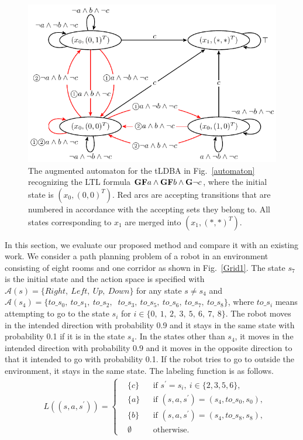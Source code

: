 \documentclass[letterpaper, 10 pt, conference]{ieeeconf}  %
\begin{document}
\begin{figure}[htbp]
   \centering
   \includegraphics[bb=0 0 374 207,scale=0.75]{ldgba.pdf}
   \caption{The augmented automaton for the tLDBA in Fig.~\ref{automaton} recognizing the LTL formula $\text{{\bf GF}}a \wedge \text{{\bf GF}}b \wedge \text{{\bf G}}\neg c$, where the initial state is $(x_0, (0,0)^T )$. Red arcs are accepting transitions that are numbered in accordance with the accepting sets they belong to. All states corresponding to $x_1$ are merged into $(x_1, (*,*)^T )$.}
   \label{automaton_aug}
\end{figure}

In this section, we evaluate our proposed method and compare it with an existing work.
We consider a path planning problem of a robot in an environment consisting of eight rooms and one corridor as shown in Fig.\ \ref{Grid1}. The state $s_7$ is the initial state and the action space is specified with $\mathcal{A}(s) = \{ Right,\ Left,\ Up,\ Down \}$ for any state $s \neq s_4$ and $\mathcal{A}(s_4) = \{ to\_s_0,\ to\_s_1,\ to\_s_2,$ $\ to\_s_3,\ to\_s_5,\ to\_s_6,\ to\_s_7,\ to\_s_8 \}$, where $to\_s_i$ means attempting to go to the state $s_i$ for $i \in \{0,\ 1,\ 2,\ 3,\ 5,\ 6,\ 7,\ 8 \}$. The robot moves in the intended direction with probability 0.9 and it stays in the same state with probability 0.1 if it is in the state $s_4$. In the states other than $s_4$, it moves in the intended direction with probability 0.9 and it moves in the opposite direction to that it intended to go with probability 0.1. If the robot tries to go to outside the environment, it stays in the same state. The labeling function is as follows.
\begin{align*}
      & L((s, a, s^{\prime})) =
      \left\{
      \begin{aligned}
        & \{ c \} &  & \text{if }s^{\prime} = s_i,\ i \in \{ 2,3,5,6 \}, \nonumber \\
        & \{ a \} &  & \text{if }(s,a,s^{\prime})=(s_4,to\_s_0,s_0), \nonumber \\
        & \{ b \} &  & \text{if }(s,a,s^{\prime})=(s_4,to\_s_8, s_8), \nonumber \\
        & \emptyset &  & \text{otherwise}.
      \end{aligned}
      \right.
    \end{align*}
\end{document}
